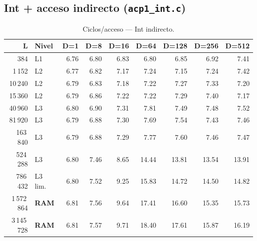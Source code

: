 \documentclass[12pt,a4paper]{article}
\newcommand{\cverde}[1]{\textcolor{verde}{#1}}
\newcommand{\cnaranja}[1]{\textcolor{naranja}{#1}}
\newcommand{\crojo}[1]{\textcolor{rojo}{#1}}
\begin{document}
\subsection{Int + acceso indirecto (\texttt{acp1\_int.c})}

\begin{table}[H]
\centering
\caption{Ciclos/acceso --- Int indirecto.}
\label{tab:int_ind}
\setlength{\tabcolsep}{4pt}\footnotesize
\begin{tabular}{rlrrrrrrr}
\toprule
\textbf{L} & \textbf{Nivel} & \textbf{D=1} & \textbf{D=8} & \textbf{D=16} & \textbf{D=64} & \textbf{D=128} & \textbf{D=256} & \textbf{D=512} \\
\midrule
384         & L1         & \cverde{6.76}  & \cverde{6.80} & \cverde{6.83} & \cverde{6.80} & \cverde{6.85} & \cverde{6.92}  & \cverde{7.41} \\
1\,152      & L2         & \cverde{6.77}  & \cverde{6.82} & \cverde{7.17} & \cverde{7.24} & \cverde{7.15} & \cverde{7.24}  & \cverde{7.42} \\
10\,240     & L2         & \cverde{6.79}  & \cverde{6.83} & \cverde{7.18} & \cverde{7.22} & \cverde{7.27} & \cverde{7.33}  & \cverde{7.20} \\
15\,360     & L2         & \cverde{6.79}  & \cverde{6.86} & \cverde{7.22} & \cverde{7.22} & \cverde{7.29} & \cverde{7.40}  & \cverde{7.17} \\
40\,960     & L3         & \cverde{6.80}  & \cverde{6.90} & \cverde{7.31} & \cverde{7.81} & \cverde{7.49} & \cverde{7.48}  & \cverde{7.52} \\
81\,920     & L3         & \cverde{6.79}  & \cverde{6.88} & \cverde{7.30} & \cverde{7.69} & \cverde{7.54} & \cverde{7.43}  & \cverde{7.46} \\
163\,840    & L3         & \cverde{6.79}  & \cverde{6.88} & \cverde{7.29} & \cverde{7.77} & \cverde{7.60} & \cverde{7.46}  & \cverde{7.47} \\
524\,288    & L3         & \cverde{6.80}  & \cverde{7.46} & \cnaranja{8.65} & \crojo{14.44} & \crojo{13.81} & \crojo{13.54} & \crojo{13.91} \\
786\,432    & L3 lim.    & \cverde{6.80}  & \cverde{7.52} & \cnaranja{9.25} & \crojo{15.83} & \crojo{14.72} & \crojo{14.50} & \crojo{14.82} \\
1\,572\,864 & \textbf{RAM} & \cverde{6.81} & \cverde{7.56} & \cnaranja{9.64} & \crojo{17.41} & \crojo{16.60} & \crojo{15.35} & \crojo{15.73} \\
3\,145\,728 & \textbf{RAM} & \cverde{6.81} & \cverde{7.57} & \cnaranja{9.71} & \crojo{18.40} & \crojo{17.61} & \crojo{15.87} & \crojo{16.19} \\
\bottomrule
\end{tabular}
\end{table}
\end{document}
